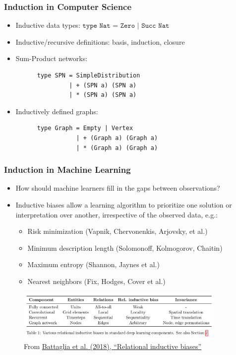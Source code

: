 \documentclass{beamer}
\begin{document}
  \begin{frame}[fragile]
    \frametitle{Induction in Computer Science}
    \begin{itemize}
      \item Inductive data types: $\texttt{type Nat = Zero | Succ Nat}$
      \item Inductive/recursive definitions: basis, induction, closure
      \item Sum-Product networks:
      \begin{lstlisting}
      type SPN = SimpleDistribution
               | + (SPN a) (SPN a)
               | * (SPN a) (SPN a)
      \end{lstlisting}
      \item Inductively defined graphs:
      \begin{lstlisting}
      type Graph = Empty | Vertex
                 | + (Graph a) (Graph a)
                 | * (Graph a) (Graph a)
      \end{lstlisting}
    \end{itemize}
  \end{frame}

  \begin{frame}
    \frametitle{Induction in Machine Learning}
    \begin{itemize}
      \item How should machine learners fill in the gaps between observations?
      \item Inductive biases allow a learning algorithm to prioritize one solution or interpretation over another, irrespective of the observed data, e.g.:
      \begin{itemize}
        \item Risk minimization (Vapnik, Chervonenkis, Arjovsky, et al.)
        \item Minimum description length (Solomonoff, Kolmogorov, Chaitin)
        \item Maximum entropy (Shannon, Jaynes et al.)
        \item Nearest neighbors (Fix, Hodges, Cover et al.)
        \end{itemize}
    \end{itemize}
    \begin{figure}[H]
      \centering
      \includegraphics[width=0.9\textwidth]{../clipart/relational_inductive_biases.jpg}
      \caption{From \href{https://arxiv.org/pdf/1806.01261.pdf}{Battaglia et al. (2018), ``Relational inductive biases''}}
    \end{figure}
  \end{frame}
\end{document}
